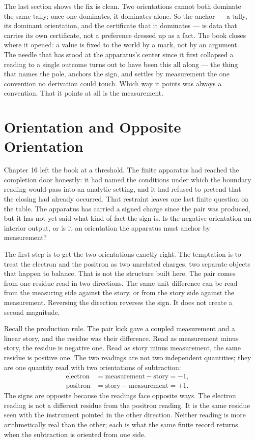 The last section shows the fix is clean. Two orientations cannot both dominate the same tally; once one dominates, it dominates alone. So the anchor --- a tally, its dominant orientation, and the certificate that it dominates --- is data that carries its own certificate, not a preference dressed up as a fact. The book closes where it opened: a value is fixed to the world by a mark, not by an argument. The needle that has stood at the apparatus's center since it first collapsed a reading to a single outcome turns out to have been this all along --- the thing that names the pole, anchors the sign, and settles by measurement the one convention no derivation could touch. Which way it points was always a convention. That it points at all is the measurement.

\section{Orientation and Opposite Orientation}

Chapter 16 left the book at a threshold. The finite apparatus had reached the
completion door honestly: it had named the conditions under which the boundary
reading would pass into an analytic setting, and it had refused to pretend that
the closing had already occurred. That restraint leaves one last finite question
on the table. The apparatus has carried a signed charge since the pair was
produced, but it has not yet said what kind of fact the sign is. Is the negative
orientation an interior output, or is it an orientation the apparatus must
anchor by measurement?

The first step is to get the two orientations exactly right. The temptation is
to treat the electron and the positron as two unrelated charges, two separate
objects that happen to balance. That is not the structure built here. The pair
comes from one residue read in two directions. The same unit difference can be
read from the measuring side against the story, or from the story side against
the measurement. Reversing the direction reverses the sign. It does not create
a second magnitude.

Recall the production rule. The pair kick gave a coupled measurement and a
linear story, and the residue was their difference. Read as measurement minus
story, the residue is negative one. Read as story minus measurement, the same
residue is positive one. The two readings are not two independent quantities;
they are one quantity read with two orientations of subtraction:
\[
  \begin{aligned}
    \text{electron} &= \text{measurement} - \text{story} = -1,\\
    \text{positron} &= \text{story} - \text{measurement} = +1.
  \end{aligned}
\]
The signs are opposite because the readings face opposite ways. The electron
reading is not a different residue from the positron reading. It is the same
residue seen with the instrument pointed in the other direction. Neither reading
is more arithmetically real than the other; each is what the same finite record
returns when the subtraction is oriented from one side.

